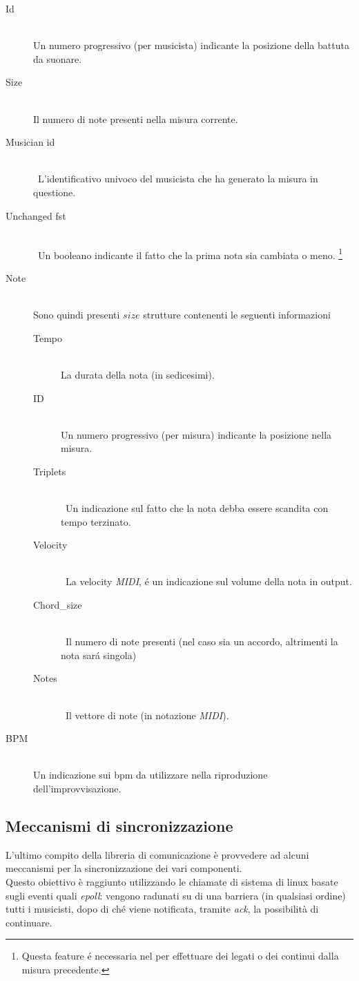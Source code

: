 \begin{description}
\item[Id] \hfill \\
Un numero progressivo (per musicista) indicante la posizione della battuta da suonare.
\item[Size] \hfill \\
Il numero di note presenti nella misura corrente.
\item[Musician id] \hfill \\\
L'identificativo univoco del musicista che ha generato la misura in questione.
\item[Unchanged fst] \hfill \\\
Un booleano indicante il fatto che la prima nota sia cambiata o meno.
\footnote{Questa feature \'e necessaria nel per effettuare dei legati
	  o dei continui dalla misura precedente.}
\item[Note] \hfill \\
Sono quindi presenti $size$ strutture contenenti le seguenti informazioni
\begin{description}
\item[Tempo] \hfill \\
La durata della nota (in sedicesimi).
\item[ID] \hfill \\
Un numero progressivo (per misura) indicante la posizione nella misura.
\item[Triplets] \hfill \\\
Un indicazione sul fatto che la nota debba essere scandita con tempo terzinato.
\item[Velocity] \hfill \\\
La velocity \emph{MIDI}, \'e un indicazione sul volume della nota in output.
\item[Chord\_size] \hfill \\\
Il numero di note presenti (nel caso sia un accordo,
altrimenti la nota sar\'a singola)
\item[Notes] \hfill \\\
Il vettore di note (in notazione \emph{MIDI}).
\end{description}
\item[BPM] \hfill \\
Un indicazione sui bpm da utilizzare nella riproduzione dell'improvvisazione.
\end{description}

\subsection{Meccanismi di sincronizzazione}
L'ultimo compito della libreria di comunicazione è
provvedere ad alcuni meccanismi per la sincronizzazione dei vari componenti.\\
Questo obiettivo è raggiunto utilizzando le chiamate di sistema di linux basate
sugli eventi quali \emph{epoll}: vengono radunati su di una barriera
(in qualsiasi ordine) tutti i musicisti, dopo di ché viene notificata, tramite
\emph{ack}, la possibilità di continuare.
